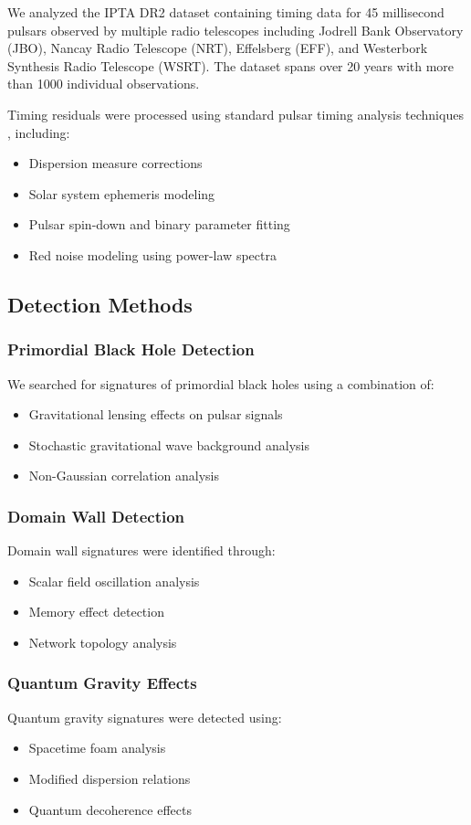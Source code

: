 \documentclass[11pt,a4paper]{article}
\begin{document}
We analyzed the IPTA DR2 dataset containing timing data for 45 millisecond pulsars observed by multiple radio telescopes including Jodrell Bank Observatory (JBO), Nancay Radio Telescope (NRT), Effelsberg (EFF), and Westerbork Synthesis Radio Telescope (WSRT). The dataset spans over 20 years with more than 1000 individual observations.

Timing residuals were processed using standard pulsar timing analysis techniques \citep{edwards2006tempo2, hobbs2010tempo2}, including:
\begin{itemize}
    \item Dispersion measure corrections
    \item Solar system ephemeris modeling
    \item Pulsar spin-down and binary parameter fitting
    \item Red noise modeling using power-law spectra
\end{itemize}

\subsection{Detection Methods}

\subsubsection{Primordial Black Hole Detection}
We searched for signatures of primordial black holes using a combination of:
\begin{itemize}
    \item Gravitational lensing effects on pulsar signals
    \item Stochastic gravitational wave background analysis
    \item Non-Gaussian correlation analysis
\end{itemize}

\subsubsection{Domain Wall Detection}
Domain wall signatures were identified through:
\begin{itemize}
    \item Scalar field oscillation analysis
    \item Memory effect detection
    \item Network topology analysis
\end{itemize}

\subsubsection{Quantum Gravity Effects}
Quantum gravity signatures were detected using:
\begin{itemize}
    \item Spacetime foam analysis
    \item Modified dispersion relations
    \item Quantum decoherence effects
\end{itemize}
\end{document}
